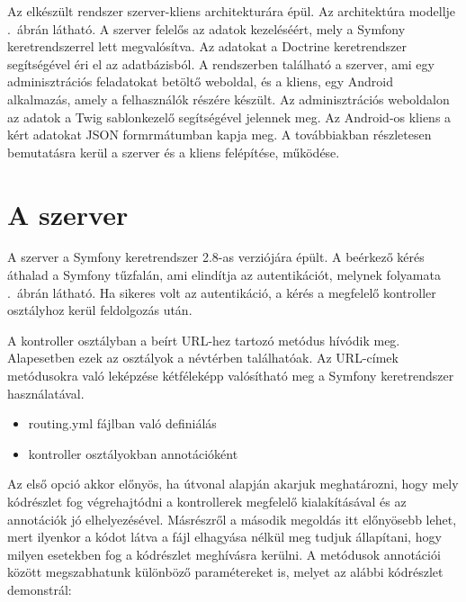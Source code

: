 Az elkészült rendszer szerver-kliens architekturára épül.
Az architektúra modellje .\ ábrán látható. 
A szerver felelős az adatok kezeléséért, mely a Symfony keretrendszerrel lett megvalósítva. 
Az adatokat a Doctrine keretrendszer segítségével éri el az adatbázisból. 
A rendszerben található a szerver, ami egy adminisztrációs feladatokat betöltő weboldal, és a kliens, egy Android alkalmazás, amely a felhasználók részére készült. 
Az adminisztrációs weboldalon az adatok a Twig sablonkezelő segítségével jelennek meg. 
Az Android-os kliens a kért adatokat JSON formrmátumban kapja meg. 
A továbbiakban részletesen bemutatásra kerül a szerver és a kliens felépítése, működése. 


\section{A szerver}
\label{szerverfelepites}
A szerver a Symfony\cite{symfonyframework} keretrendszer 2.8-as verziójára épült. 
A beérkező kérés áthalad a Symfony tűzfalán, ami elindítja az autentikációt, melynek folyamata .\ ábrán látható. 
Ha sikeres volt az autentikáció, a kérés a megfelelő kontroller osztályhoz kerül feldolgozás után. 


A kontroller osztályban a beírt URL-hez tartozó metódus hívódik meg. 
Alapesetben ezek az osztályok a  névtérben találhatóak. 
Az URL-címek metódusokra való leképzése kétféleképp valósítható meg a Symfony keretrendszer használatával. 

\begin{itemize}
	\item routing.yml fájlban való definiálás
	\item kontroller osztályokban annotációként
\end{itemize}

Az első opció akkor előnyös, ha útvonal alapján akarjuk meghatározni, hogy mely kódrészlet fog végrehajtódni a kontrollerek megfelelő kialakításával és az annotációk jó elhelyezésével. 
Másrészről a második megoldás itt előnyösebb lehet, mert ilyenkor a kódot látva a fájl elhagyása nélkül meg tudjuk állapítani, hogy milyen esetekben fog a kódrészlet meghívásra kerülni. 
A metódusok annotációi között megszabhatunk különböző paramétereket is, melyet az alábbi kódrészlet demonstrál:

